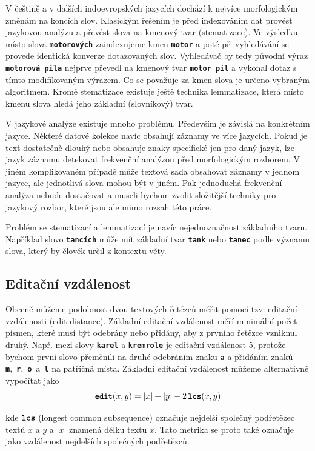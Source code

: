 \documentclass[11pt,letterpaper,oneside,openright]{book}
\newcommand{\bftt}[1]{\texttt{\textbf{#1}}}
\begin{document}
V češtině a v dalších indoevropských jazycích dochází k nejvíce morfologickým
změnám na koncích slov. Klasickým řešením je před indexováním dat provést
jazykovou analýzu a převést slova na kmenový tvar (stematizace). Ve výsledku
místo slova \bftt{motorových} zaindexujeme kmen \bftt{motor} a poté při
vyhledávání se provede identická konverze dotazovaných slov. Vyhledávač by tedy
původní výraz \bftt{motorová pila} nejprve převedl na kmenový tvar \bftt{motor
pil} a vykonal dotaz s tímto modifikovaným výrazem. Co se považuje za kmen
slova je určeno vybraným algoritmem. Kromě stematizace existuje ještě technika
lemmatizace, která místo kmenu slova hledá jeho základní (slovníkový) tvar.

V jazykové analýze existuje mnoho problémů. Především je závislá na konkrétním
jazyce. Některé datové kolekce navíc obsahují záznamy ve více jazycích. Pokud
je text dostatečně dlouhý nebo obsahuje znaky specifické jen pro daný jazyk,
lze jazyk záznamu detekovat frekvenční analýzou před morfologickým rozborem. V
jiném komplikovaném případě může textová sada obsahovat záznamy v jednom
jazyce, ale jednotlivá slova mohou být v jiném. Pak jednoduchá frekvenční
analýza nebude dostačovat a museli bychom zvolit složitější techniky pro
jazykový rozbor, které jsou ale mimo rozsah této práce.

Problém se stematizací a lemmatizací je navíc nejednoznačnost základního tvaru.
Například slovo \bftt{tancích} může mít základní tvar \bftt{tank} nebo
\bftt{tanec} podle významu slova, který by člověk určil z kontextu věty.

\subsection{Editační vzdálenost}
Obecně můžeme podobnost dvou textových řetězců měřit pomocí tzv. editační
vzdálenosti (edit distance). Základní editační vzdálenost měří minimální počet
písmen, které musí být odebrány nebo přidány, aby z prvního řetězce vzniknul
druhý. Např. mezi slovy \bftt{karel} a \bftt{kremrole} je editační vzdálenost
5, protože bychom první slovo přeměnili na druhé odebráním znaku \bftt{a}
a přidáním znaků \bftt{m},~\bftt{r},~\bftt{o}~a~\bftt{l} na patřičná místa.
Základní editační vzdálenost můžeme alternativně vypočítat jako \[\bftt{edit}(x,
y) = |x| + |y| - 2\,\bftt{lcs}(x, y)\]

kde $\bftt{lcs}$ (longest common subsequence) označuje nejdelší společný
podřetězec textů $x$ a $y$ a $|x|$ znamená délku textu $x$. Tato metrika se
proto také označuje jako vzdálenost nejdelších společných podřetězců.
\end{document}
